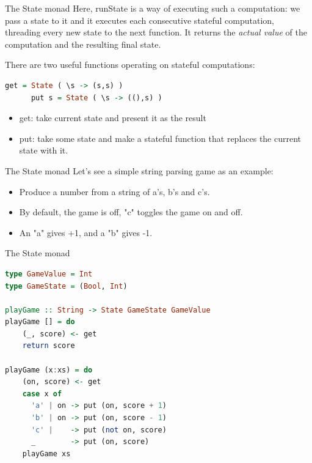 \documentclass{beamer}
\begin{document}
\begin{frame}[fragile]{The State monad}
    Here, runState is a way of executing such a computation: we pass a
    state to it and it executes each consecutive stateful computation,
    threading every new state to the next function. It returns the
    \textit{actual value} of the computation and the resulting final state.

    \bigbreak
    There are two useful functions operating on stateful computations:

    \begin{minipage}{\linewidth} \hspace{1cm}
    \begin{lstlisting}[language=haskell, numbers=none, frame=none]
      get = State ( \s -> (s,s) )
      put s = State ( \s -> ((),s) )
    \end{lstlisting}
    \end{minipage} \hspace{1cm}

    \begin{itemize}
        \item get: take current state and present it as the result
        \item put: take some state and make a stateful function that
              replaces the current state with it.
    \end{itemize}
\end{frame}

\begin{frame}[fragile]{The State monad}
    Let's see a simple string parsing game as an example:

    \bigbreak
    \begin{itemize}
        \item Produce a number from a string of a's, b's and c's.
        \item By default, the game is off, "c" toggles the game on and off.
        \item An "a" gives +1, and a "b" gives -1.
    \end{itemize}
\end{frame}

\begin{frame}[fragile]{The State monad}
    \begin{minipage}{\linewidth} \hspace{1cm}
    \begin{lstlisting}[language=haskell, numbers=none, frame=none]
type GameValue = Int
type GameState = (Bool, Int)

playGame :: String -> State GameState GameValue
playGame [] = do
    (_, score) <- get
    return score

playGame (x:xs) = do
    (on, score) <- get
    case x of
      'a' | on -> put (on, score + 1)
      'b' | on -> put (on, score - 1)
      'c' |    -> put (not on, score)
      _        -> put (on, score)
    playGame xs
    \end{lstlisting}
    \end{minipage} \hspace{1cm}
\end{frame}
\end{document}
